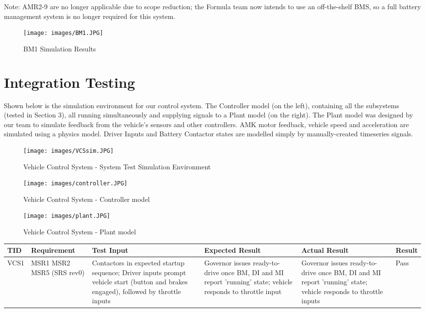 \documentclass[12pt, titlepage]{article}
\newcommand{\tableVspace}{5mm}
\newcommand{\TID}{0.05\textwidth}
\newcommand{\Requirement}{0.14\textwidth}
\newcommand{\TestInput}{0.16\textwidth}
\newcommand{\ExpResult}{0.23\textwidth}
\newcommand{\ActResult}{0.23\textwidth}
\newcommand{\Result}{0.06\textwidth}
\begin{document}
\noindent Note: AMR2-9 are no longer applicable due to scope reduction; the Formula team now intends to use an off-the-shelf BMS, so a full battery management system is no longer required for this system.

\begin{figure}[h!]
    \texttt{[image: images/BM1.JPG]}
    \centering
    \caption{BM1 Simulation Results}
\end{figure} 



\section{Integration Testing}

Shown below is the simulation environment for our control system. The Controller model (on the left), containing all the subsystems (tested in Section 3), all running simultaneously and supplying signals to a Plant model (on the right). The Plant model was designed by our team to simulate feedback from the vehicle's sensors and other controllers. AMK motor feedback, vehicle speed and acceleration are simulated using a physics model. Driver Inputs and Battery Contactor states are modelled simply by manually-created timeseries signals. 

\begin{figure}[h!]
    \texttt{[image: images/VCSsim.JPG]}
    \centering
    \caption{Vehicle Control System - System Test Simulation Environment}
\end{figure}

\begin{figure}[h!]
    \texttt{[image: images/controller.JPG]}
    \centering
    \caption{Vehicle Control System - Controller model}
\end{figure}

\begin{figure}[h!]
    \texttt{[image: images/plant.JPG]}
    \centering
    \caption{Vehicle Control System - Plant model}
\end{figure}

\vspace{\tableVspace}\noindent
\begin{tabular}{| p{\TID} | p{\Requirement} | p{\TestInput} | p{\ExpResult} | p{\ActResult} | p{\Result} | }
\hline
\rowcolor[gray]{0.9}
\hline
TID & Requirement & Test Input & Expected Result & Actual Result & Result \\
\hline
VCS1 &  MSR1 MSR2 MSR5 (SRS rev0) & Contactors in expected startup sequence; Driver inputs prompt vehicle start (button and brakes engaged), followed by throttle inputs & Governor issues ready-to-drive once BM, DI and MI report 'running' state; vehicle responds to throttle input & Governor issues ready-to-drive once BM, DI and MI report 'running' state; vehicle responds to throttle inputs & Pass\\
\hline
\end{tabular} \\
\end{document}
